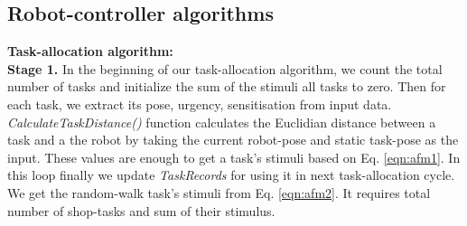 \documentclass[final,5p,times,twocolumn]{elsarticle}
\begin{document}
\subsection{Robot-controller algorithms}
\textbf{Task-allocation algorithm:}\\
\textbf{Stage 1.} In the beginning of our task-allocation algorithm, we count the total number of tasks and initialize the sum of the stimuli all tasks to zero. Then for each task, we extract its pose, urgency, sensitisation from input data.\\  \textit{CalculateTaskDistance()} function calculates the Euclidian distance between a task and a the robot by taking the current robot-pose and static task-pose as the input. These values are enough to get a task's stimuli based on Eq. \ref{eqn:afm1}. In this loop finally we update \textit{TaskRecords} for using it in next task-allocation cycle. We get the random-walk task's stimuli from Eq. \ref{eqn:afm2}. It requires total number of shop-tasks and sum of their stimulus.\\
\end{document}
